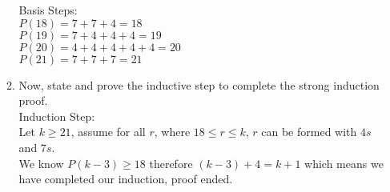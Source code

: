 \begin{enumerate}
\begin{enumerate}
Basis Steps:\\ 
$P(18) = 7+7+4 = 18$\\
$P(19) = 7+4+4+4 = 19$\\
$P(20) = 4+4+4+4+4 = 20$\\
$P(21) = 7+7+7= 21$\\

\item Now, state and prove the inductive step to complete the strong induction proof.\\

Induction Step:\\
Let $k \geq 21$, assume for all $r$, where $18 \leq r \leq k$, $r$ can be formed with $4s$ and $7s$.\\

We know $P(k-3) \geq 18$ therefore $(k-3)+4 = k+1$ which means we have completed our induction, proof ended.


\end{enumerate}

\end{enumerate}


        



